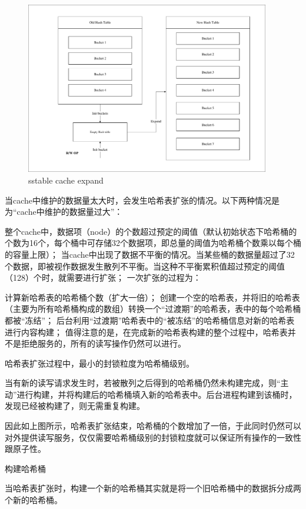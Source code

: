 \begin{enumerate}
\begin{enumerate}
				\begin{figure}[H]
					\centering
					\includegraphics[width=0.95\textwidth]{pdf/cache_expend.pdf}
					\caption{sstable cache expand}
					\label{sstable_cache_expand}
				\end{figure}
				当cache中维护的数据量太大时，会发生哈希表扩张的情况。以下两种情况是为“cache中维护的数据量过大”：

整个cache中，数据项（node）的个数超过预定的阈值（默认初始状态下哈希桶的个数为16个，每个桶中可存储32个数据项，即总量的阈值为哈希桶个数乘以每个桶的容量上限）；
当cache中出现了数据不平衡的情况。当某些桶的数据量超过了32个数据，即被视作数据发生散列不平衡。当这种不平衡累积值超过预定的阈值（128）个时，就需要进行扩张；
一次扩张的过程为：

计算新哈希表的哈希桶个数（扩大一倍）；
创建一个空的哈希表，并将旧的哈希表（主要为所有哈希桶构成的数组）转换一个“过渡期”的哈希表，表中的每个哈希桶都被“冻结”；
后台利用“过渡期”哈希表中的“被冻结”的哈希桶信息对新的哈希表进行内容构建；
值得注意的是，在完成新的哈希表构建的整个过程中，哈希表并不是拒绝服务的，所有的读写操作仍然可以进行。

哈希表扩张过程中，最小的封锁粒度为哈希桶级别。

当有新的读写请求发生时，若被散列之后得到的哈希桶仍然未构建完成，则“主动”进行构建，并将构建后的哈希桶填入新的哈希表中。后台进程构建到该桶时，发现已经被构建了，则无需重复构建。

因此如上图所示，哈希表扩张结束，哈希桶的个数增加了一倍，于此同时仍然可以对外提供读写服务，仅仅需要哈希桶级别的封锁粒度就可以保证所有操作的一致性跟原子性。

构建哈希桶

当哈希表扩张时，构建一个新的哈希桶其实就是将一个旧哈希桶中的数据拆分成两个新的哈希桶。


\end{enumerate}
\end{enumerate}
